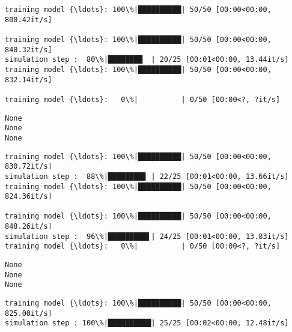 \documentclass[11pt]{article}
\begin{document}
    \begin{Verbatim}[commandchars=\\\{\}]
training model {\ldots}: 100\%|██████████| 50/50 [00:00<00:00, 800.42it/s]

training model {\ldots}: 100\%|██████████| 50/50 [00:00<00:00, 840.32it/s]
simulation step :  80\%|████████  | 20/25 [00:01<00:00, 13.44it/s]
training model {\ldots}: 100\%|██████████| 50/50 [00:00<00:00, 832.14it/s]

training model {\ldots}:   0\%|          | 0/50 [00:00<?, ?it/s]
    \end{Verbatim}

    \begin{Verbatim}[commandchars=\\\{\}]
None
None
None
    \end{Verbatim}

    \begin{Verbatim}[commandchars=\\\{\}]
training model {\ldots}: 100\%|██████████| 50/50 [00:00<00:00, 830.72it/s]
simulation step :  88\%|████████▊ | 22/25 [00:01<00:00, 13.66it/s]
training model {\ldots}: 100\%|██████████| 50/50 [00:00<00:00, 824.36it/s]

training model {\ldots}: 100\%|██████████| 50/50 [00:00<00:00, 848.26it/s]
simulation step :  96\%|█████████▌| 24/25 [00:01<00:00, 13.83it/s]
training model {\ldots}:   0\%|          | 0/50 [00:00<?, ?it/s]
    \end{Verbatim}

    \begin{Verbatim}[commandchars=\\\{\}]
None
None
None
    \end{Verbatim}

    \begin{Verbatim}[commandchars=\\\{\}]
training model {\ldots}: 100\%|██████████| 50/50 [00:00<00:00, 825.00it/s]
simulation step : 100\%|██████████| 25/25 [00:02<00:00, 12.48it/s]
    \end{Verbatim}
\end{document}
